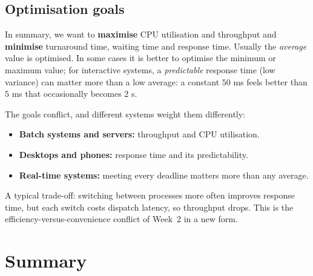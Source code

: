 \documentclass[11pt,a4paper]{article}
\begin{document}
\subsection{Optimisation goals}

In summary, we want to \textbf{maximise} CPU utilisation and throughput and \textbf{minimise} turnaround time, waiting time and response time. Usually the \emph{average} value is optimised. In some cases it is better to optimise the minimum or maximum value; for interactive systems, a \emph{predictable} response time (low variance) can matter more than a low average: a constant $50$ ms feels better than $5$ ms that occasionally becomes $2$ s.

The goals conflict, and different systems weight them differently:
\begin{itemize}
  \item \textbf{Batch systems and servers:} throughput and CPU utilisation.
  \item \textbf{Desktops and phones:} response time and its predictability.
  \item \textbf{Real-time systems:} meeting every deadline matters more than any average.
\end{itemize}
A typical trade-off: switching between processes more often improves response time, but each switch costs dispatch latency, so throughput drops. This is the efficiency-versus-convenience conflict of Week~2 in a new form.

\section{Summary}
\end{document}

